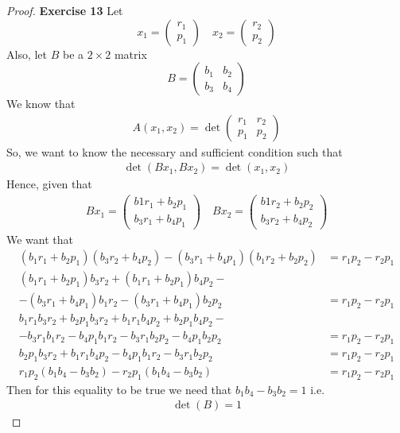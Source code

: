 \documentclass[11pt]{article}
\theoremstyle{definition}
\begin{document}
\cleardoublepage
\begin{proof}{\textbf{Exercise 13}}
    Let
    $$x_1 = \begin{pmatrix} r_1 \\p_1 \end{pmatrix}
    \quad x_2 = \begin{pmatrix} r_2 \\p_2 \end{pmatrix}$$
    Also, let $B$ be a $2\times 2$ matrix
    $$B = \begin{pmatrix} b_1 & b_2 \\ b_3 & b_4 \end{pmatrix}$$
    We know that 
    \begin{align*}
        A(x_1, x_2) = \det\begin{pmatrix}
            r_1 & r_2 \\ p_1 & p_2
        \end{pmatrix}
    \end{align*}
    So, we want to know the necessary and sufficient condition such that
    \begin{align*}
        \det(Bx_1, Bx_2) = \det(x_1, x_2)
    \end{align*}
    Hence, given that
    \begin{align*}
        Bx_1 = \begin{pmatrix}
            b1r_1 + b_2p_1\\ b_3r_1 + b_4p_1
        \end{pmatrix}
        \quad Bx_2 = \begin{pmatrix}
            b1r_2 + b_2p_2 \\ b_3r_2 + b_4p_2
        \end{pmatrix}
    \end{align*}
    We want that 
    \begin{align*}
        (b_1r_1 + b_2p_1)(b_3r_2 + b_4p_2) - (b_3r_1 + b_4p_1)(b_1r_2 + b_2p_2)
        &= r_1 p_2 - r_2 p_1\\
        (b_1r_1 + b_2p_1)b_3r_2 + (b_1r_1 + b_2p_1)b_4p_2 -\quad\\
        - (b_3r_1 + b_4p_1)b_1r_2 - (b_3r_1 + b_4p_1)b_2p_2
        &= r_1 p_2 - r_2 p_1\\
        b_1r_1b_3r_2 + b_2p_1b_3r_2 + b_1r_1b_4p_2 + b_2p_1b_4p_2 -\quad\\
        - b_3r_1b_1r_2 - b_4p_1b_1r_2 - b_3r_1b_2p_2 - b_4p_1b_2p_2
        &= r_1 p_2 - r_2 p_1\\
        b_2p_1b_3r_2 + b_1r_1b_4p_2 - b_4p_1b_1r_2 - b_3r_1b_2p_2
        &= r_1 p_2 - r_2 p_1\\
        r_1p_2(b_1b_4 - b_3b_2) - r_2p_1(b_1b_4 - b_3b_2)
        &= r_1 p_2 - r_2 p_1
    \end{align*}
    Then for this equality to be true we need that $b_1b_4 - b_3b_2 = 1$ i.e.
    \begin{align*}
        \det(B) = 1
    \end{align*}
\end{proof}
\end{document}
